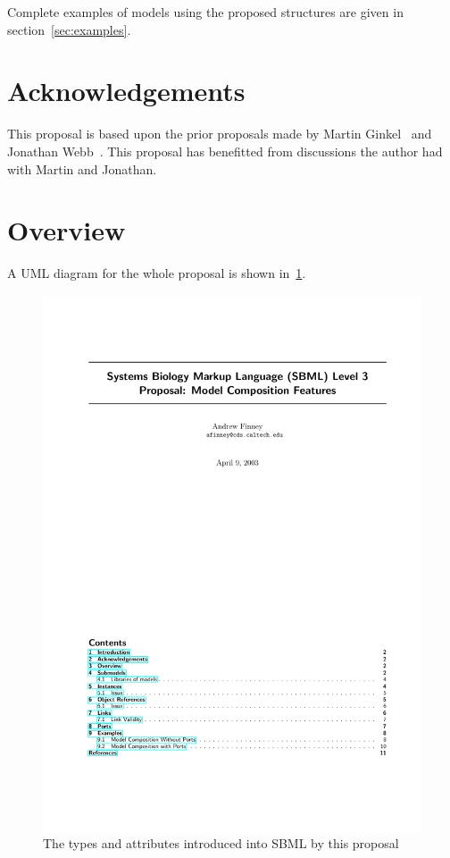 \documentclass{cekarticle}
\begin{document}
Complete examples of models using the proposed structures are given in section~\ref{sec:examples}.

\section{Acknowledgements}

This proposal is based upon the prior proposals made by Martin Ginkel~\citep{ginkel:2002} and Jonathan Webb~\citep{webb:2003}.
This proposal has benefitted from discussions the author had with Martin and Jonathan.

\section{Overview}

A UML diagram for the whole proposal is shown in~\ref{fig:model-composition}.

\begin{figure}[h]
  \vspace*{8pt}
  \centering
  \includegraphics[scale = 0.7]{model-composition}
  \caption{The types and attributes introduced into SBML by this proposal}
  \label{fig:model-composition}
\end{figure}
\end{document}
